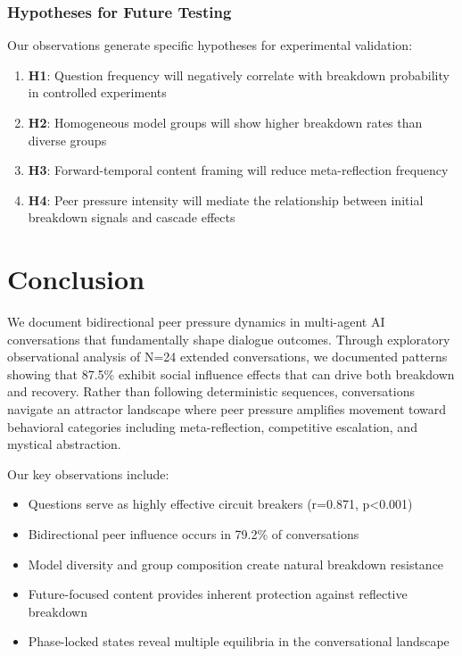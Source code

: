 \documentclass[11pt,letterpaper]{article}
\newcommand{\exponedataTotalSessionsRaw}{24}
\newcommand{\exponedataTotalSessions}{N=\exponedataTotalSessionsRaw}
\newcommand{\exponedataPeerPressurePercentage}{87.5\%}
\newcommand{\exponedataBidirectionalPercentage}{79.2\%}
\newcommand{\exponedataQuestionCorrelation}{0.871}
\newcommand{\exponedataQuestionPValue}{p<0.001}
\begin{document}
\subsubsection{Hypotheses for Future Testing}

Our observations generate specific hypotheses for experimental validation:

\begin{enumerate}
    \item \textbf{H1}: Question frequency will negatively correlate with breakdown probability in controlled experiments
    \item \textbf{H2}: Homogeneous model groups will show higher breakdown rates than diverse groups
    \item \textbf{H3}: Forward-temporal content framing will reduce meta-reflection frequency
    \item \textbf{H4}: Peer pressure intensity will mediate the relationship between initial breakdown signals and cascade effects
\end{enumerate}

\section{Conclusion}

We document bidirectional peer pressure dynamics in multi-agent AI conversations that fundamentally shape dialogue outcomes. Through exploratory observational analysis of \exponedataTotalSessions{} extended conversations, we documented patterns showing that \exponedataPeerPressurePercentage{} exhibit social influence effects that can drive both breakdown and recovery. Rather than following deterministic sequences, conversations navigate an attractor landscape where peer pressure amplifies movement toward behavioral categories including meta-reflection, competitive escalation, and mystical abstraction.

Our key observations include:
\begin{itemize}
    \item Questions serve as highly effective circuit breakers (r=\exponedataQuestionCorrelation{}, \exponedataQuestionPValue{})
    \item Bidirectional peer influence occurs in \exponedataBidirectionalPercentage{} of conversations
    \item Model diversity and group composition create natural breakdown resistance
    \item Future-focused content provides inherent protection against reflective breakdown
    \item Phase-locked states reveal multiple equilibria in the conversational landscape
\end{itemize}
\end{document}
